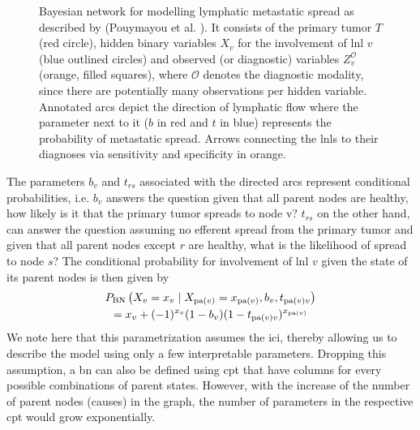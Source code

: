 \documentclass[\relativeRoot/main.tex]{subfiles}
\begin{document}
\begin{figure}
    \centering
    \def\svgwidth{0.35\textwidth}
    
    \caption{Bayesian network for modelling lymphatic metastatic spread as described by (Pouymayou et al. \cite{pouymayou_bayesian_2019}). It consists of the primary tumor $T$ (red circle), hidden binary variables $X_v$ for the involvement of \gls{lnl} $v$ (blue outlined circles) and observed (or diagnostic) variables $Z_v^\mathcal{O}$ (orange, filled squares), where $\mathcal{O}$ denotes the diagnostic modality, since there are potentially many observations per hidden variable. Annotated arcs depict the direction of lymphatic flow where the parameter next to it ($b$ in red and $t$ in blue) represents the probability of metastatic spread. Arrows connecting the \glspl{lnl} to their diagnoses via sensitivity and specificity in orange.}
    \label{fig:bn:graph}
\end{figure}

The parameters $b_v$ and $t_{rs}$   associated with the directed arcs represent conditional probabilities, i.e. $b_v$ answers the question given that all parent nodes are healthy, how likely is it that the primary tumor spreads to node v? $t_{rs}$ on the other hand, can answer the question assuming no efferent spread from the primary tumor and given that all parent nodes except $r$ are healthy, what is the likelihood of spread to node $s$? The conditional probability for involvement of \gls{lnl} $v$ given the state of its parent nodes is then given by
%
\begin{multline}
    P_\text{BN} \left( X_v = x_v \mid X_{\operatorname{pa}(v)} = x_{\operatorname{pa}(v)}, b_v, t_{\operatorname{pa}(v)v} \right) \\
    = x_v + (-1)^{x_v} (1 - b_v) (1 - t_{\operatorname{pa}(v)v})^{x_{\operatorname{pa}(v)}}
\end{multline}
%
We note here that this parametrization assumes the \gls{ici}, thereby allowing us to describe the model using only a few interpretable parameters. Dropping this assumption, a \gls{bn} can also be defined using \gls{cpt} that have columns for every possible combinations of parent states. However, with the increase of the number of parent nodes (causes) in the graph, the number of parameters in the respective \gls{cpt} would grow exponentially.
\end{document}
